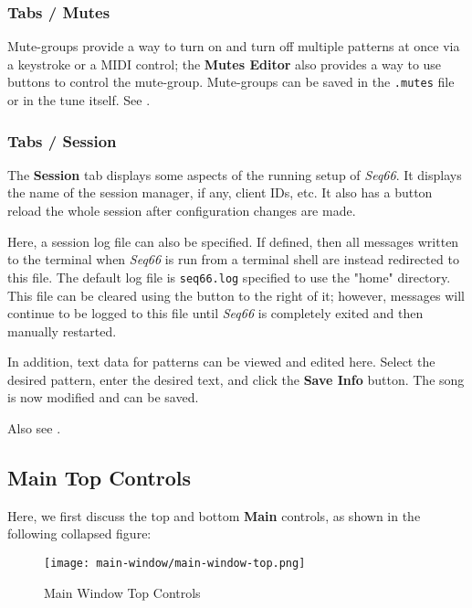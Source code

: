 \subsubsection{Tabs / Mutes}
\label{subsubsec:introduction_main_tabs_mutes}

   Mute-groups provide a way to turn on and turn off multiple patterns at once
   via a keystroke or a MIDI control; the \textbf{Mutes Editor} also provides a
   way to use buttons to control the mute-group.
   Mute-groups can be saved in the
   \texttt{.mutes} file or in the tune itself.
   See .

\subsubsection{Tabs / Session}
\label{subsubsec:introduction_main_tabs_session}

   The \textbf{Session} tab displays some aspects of the running setup of
   \textsl{Seq66}.  It displays the name of the session manager, if any, client
   IDs, etc.  It also has a button reload the whole session after configuration
   changes are made.

   Here, a session log file can also be specified.
   If defined, then all messages written to the terminal when \textsl{Seq66}
   is run from a terminal shell are instead redirected to this file.
   The default log file is \texttt{seq66.log} specified to use
   the "home" directory.
   This file can be cleared using the button to the right of it; however,
   messages will continue to be logged to this file until
   \textsl{Seq66} is completely exited and then manually restarted.

   In addition, text data for patterns can be viewed and edited here.
   Select the desired pattern, enter the desired text, and click the
   \textbf{Save Info} button.
   The song is now modified and can be saved.

   Also see .

\subsection{Main Top Controls}
\label{subsec:introduction_main_top_controls}

   Here, we first discuss the top and bottom \textbf{Main} controls, as
   shown in the following collapsed figure:

\begin{figure}[H]
   \centering 
   \texttt{[image: main-window/main-window-top.png]}
   \caption{Main Window Top Controls}
   \label{fig:main_window_top_controls}
\end{figure}

